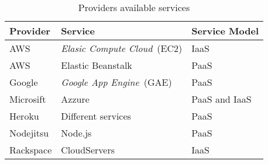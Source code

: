 \begin{table}
  \begin{tabular}{ | l | l | l | }
    \hline
    \textbf{Provider} & \textbf{Service} & \textbf{Service Model} \\ \hline
    AWS & \emph{Elasic Compute Cloud}~(EC2) & IaaS \\ \hline
    AWS & Elastic Beanstalk & PaaS \\ \hline
    Google & \emph{Google App Engine}~(GAE) & PaaS \\ \hline
    Microsift & Azzure & PaaS and IaaS \\ \hline
    Heroku & Different services & PaaS \\ \hline
    Nodejitsu & Node.js & PaaS \\ \hline
    Rackspace & CloudServers & IaaS \\ \hline
  \end{tabular}
  \caption{Providers available services}
  \label{table:providerservices}
\end{table}

